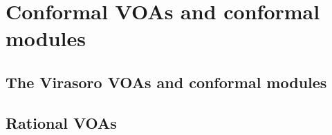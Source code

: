 \section{Conformal VOAs and conformal modules}
    \subsection{The Virasoro VOAs and conformal modules}

    \subsection{Rational VOAs}